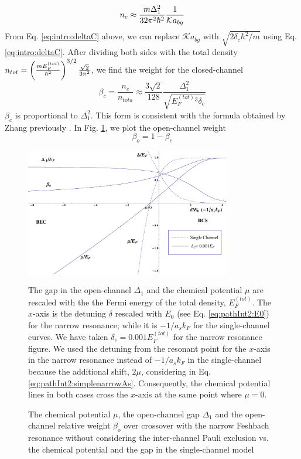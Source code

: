 \begin{equation}
{n_{c}}\approx\frac{m\Delta_{1}^{2}}{32\pi^{2}\hbar^{2}}\frac{1}{\mathcal{K}a_{bg}}
\end{equation}
From Eq. \ref{eq:intro:deltaC} above, we can replace $\mathcal{K}a_{bg}$ with $\sqrt{2\delta_{c}\hbar^{2}/m}$ using Eq. \ref{eq:intro:deltaC}. After  dividing both sides with the total density $n_{tot}=\left(\frac{mE_{F}^{(tot)}}{\hbar^{2}}\right)^{3/2}\frac{\sqrt{2}}{3\pi^{2}}$, we find the weight for the closed-channel
\begin{equation}
\beta_{c}=\frac{n_{c}}{n_{tota}}\approx\frac{3\sqrt2}{128}\frac{\Delta_{1}^{2}}{\sqrt{{E_{F}^{(tot)}}{}^{3}\delta_{c}}}
\end{equation}
 $\beta_{c}$ is proportional to $\Delta_{1}^{2}$.  This form is consistent with the formula obtained by Zhang previously \cite{shizhongUniv}.   In Fig. \ref{fig:pathInt2:narrow}, we plot the open-channel weight 
 \begin{equation}
 \beta_{o}=1-\beta_{c}
 \end{equation}

\begin{figure}[htbp]
\begin{center}
\includegraphics[width=0.8\textwidth]{narrow}
\caption{The chemical potential $\mu$, the open-channel gap $\Delta_{1}$ and the open-channel relative weight $\beta_{o}$ over crossover with the narrow Feshbach resonance without considering the inter-channel Pauli exclusion  vs. the chemical potential and the gap in the single-channel model} 
\label{fig:pathInt2:narrow}
\parbox{0.8\textwidth}{\small  The gap in the open-channel $\Delta_{1}$ and the chemical potential $\mu$ are rescaled with the the Fermi energy of the total density, $E_{F}^{(tot)}$.  The $x$-axis is the detuning $\delta$ rescaled with $E_{0}$ (see Eq. \ref{eq:pathInt2:E0}) for the narrow resonance; while it is $-1/a_{s}k_{F}$ for the single-channel curves. We have taken $\delta_{c}=0.001E_{F}^{(tot)}$ for the narrow resonance figure. We used the detuning from the resonant point  for the $x$-axis in the narrow resonance instead of $-1/a_{s}k_{F}$ in the single-channel because the additional shift, $2\mu$, considering in Eq. \ref{eq:pathInt2:simplenarrowAs}.  Consequently, the chemical potential lines in both cases cross the $x$-axis at the same point where $\mu=0$.  }
\end{center}
\end{figure}


